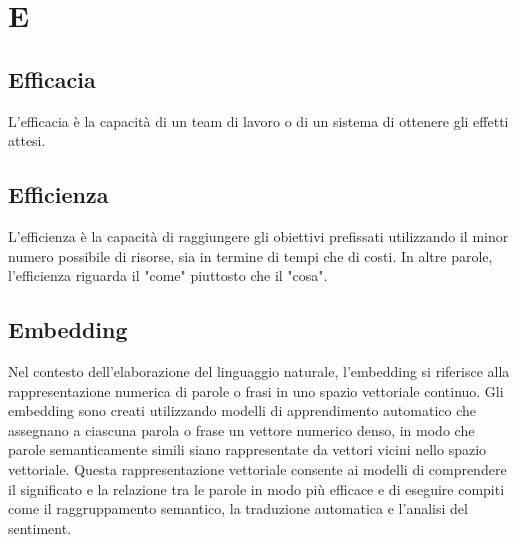 \section{E}

\vspace{2em}
\subsection*{Efficacia}
L'efficacia è la capacità di un team di lavoro o di un sistema di ottenere gli effetti attesi.

\vspace{2em}
\subsection*{Efficienza}
L'efficienza è la capacità di raggiungere gli obiettivi prefissati utilizzando il minor numero possibile di risorse, sia in termine di tempi che di costi. In altre parole, l'efficienza riguarda il "come" piuttosto che il "cosa".

\vspace{2em}
\subsection*{Embedding}
\par Nel contesto dell'elaborazione del linguaggio naturale, l'embedding si riferisce alla rappresentazione numerica di parole o frasi in uno spazio vettoriale continuo. Gli embedding sono creati utilizzando modelli di apprendimento automatico che assegnano a ciascuna parola o frase un vettore numerico denso, in modo che parole semanticamente simili siano rappresentate da vettori vicini nello spazio vettoriale. Questa rappresentazione vettoriale consente ai modelli di comprendere il significato e la relazione tra le parole in modo più efficace e di eseguire compiti come il raggruppamento semantico, la traduzione automatica e l'analisi del sentiment.
